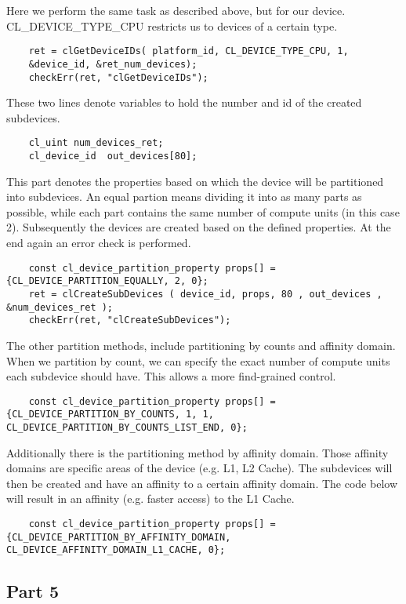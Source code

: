 \documentclass{article}
\begin{document}
\noindent Here we perform the same task as described above, but for our device.\\
CL\_DEVICE\_TYPE\_CPU restricts us to devices of a certain type.
\begin{lstlisting}
    ret = clGetDeviceIDs( platform_id, CL_DEVICE_TYPE_CPU, 1, 
    &device_id, &ret_num_devices);
    checkErr(ret, "clGetDeviceIDs");
\end{lstlisting}

\noindent These two lines denote variables to hold the number and id of the created subdevices.
\begin{lstlisting}
    cl_uint num_devices_ret;
    cl_device_id  out_devices[80];
\end{lstlisting}

\noindent This part denotes the properties based on which the device will be partitioned into subdevices.
An equal partion means dividing it into as many parts as possible, while each part contains the same number of compute units (in this case 2).
Subsequently the devices are created based on the defined properties.
At the end again an error check is performed.
\begin{lstlisting}
    const cl_device_partition_property props[] = {CL_DEVICE_PARTITION_EQUALLY, 2, 0};
    ret = clCreateSubDevices ( device_id, props, 80 , out_devices , &num_devices_ret );
    checkErr(ret, "clCreateSubDevices");
\end{lstlisting}
\newpage

The other partition methods, include partitioning by counts and affinity domain.
When we partition by count, we can specify the exact number of compute units each subdevice should have.
This allows a more find-grained control.
\begin{lstlisting}
    const cl_device_partition_property props[] = {CL_DEVICE_PARTITION_BY_COUNTS, 1, 1, CL_DEVICE_PARTITION_BY_COUNTS_LIST_END, 0};
\end{lstlisting}
Additionally there is the partitioning method by affinity domain.
Those affinity domains are specific areas of the device (e.g. L1, L2 Cache).
The subdevices will then be created and have an affinity to a certain affinity domain.
The code below will result in an affinity (e.g. faster access) to the L1 Cache.
\begin{lstlisting}
    const cl_device_partition_property props[] = {CL_DEVICE_PARTITION_BY_AFFINITY_DOMAIN, CL_DEVICE_AFFINITY_DOMAIN_L1_CACHE, 0};
\end{lstlisting}
\subsection*{Part 5}
\end{document}
